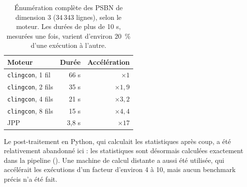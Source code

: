 \documentclass[12pt, a4paper]{article}
\begin{document}
\begin{table}[H]
\centering
\small
\caption{Énumération complète des PSBN de dimension 3 (34\,343 lignes), selon le moteur. Les durées de plus de 10 s, mesurées une fois, varient d'environ 20~\% d'une exécution à l'autre.}
\label{tab:parallelisme}
\begin{tabular}{lrr}
\toprule
Moteur & Durée & Accélération \\
\midrule
\texttt{clingcon}, 1 fil & 66 s & $\times 1$ \\
\texttt{clingcon}, 2 fils & 35 s & $\times 1{,}9$ \\
\texttt{clingcon}, 4 fils & 21 s & $\times 3{,}2$ \\
\texttt{clingcon}, 8 fils & 15 s & $\times 4{,}4$ \\
JPP & 3,8 s & $\times 17$ \\
\bottomrule
\end{tabular}
\end{table}



Le post-traitement en Python, qui calculait les statistiques après coup, a été relativement abandonné ici : les statistiques sont désormais calculées exactement dans la pipeline ().
Une machine de calcul distante a aussi été utilisée, qui accélérait les exécutions d'un facteur d'environ 4 à 10, mais aucun benchmark précis n'a été fait.
\end{document}
